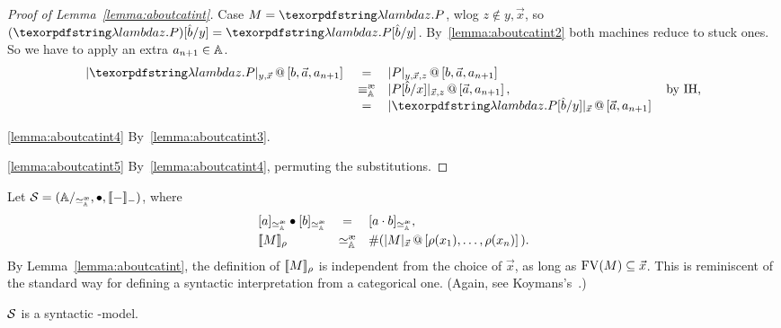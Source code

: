 \begin{proof}[Proof of Lemma~\ref{lemma:aboutcatint}]
Case $M = \lam z.P$, wlog $z\notin y,\vec x$, so $(\lam z.P)\subst{y}{\cons b} = \lam z.P\subst{y}{\cons b}$.
	By~\ref{lemma:aboutcatint2} both machines reduce to stuck ones.
	So we have to apply an extra $a_{n+1}\in\mathbb{A}$.
\[
	\begin{array}{lcll}
	\append{\CInt[y,\vec x]{\lam z.P}}{b,\vec a,a_{n+1}}&=&\append{\CInt[y,\vec x,z]{P}}{b,\vec a,a_{n+1}}&\\
	&\equivea&\append{\CInt[\vec x,z]{P\subst{x}{\cons b}}}{\vec a,a_{n+1}},&\textrm{by IH,}\\
	&=& \append{\CInt{\lam z.P\subst{y}{\cons b}}}{\vec a,a_{n+1}}
	\end{array}
\]

\ref{lemma:aboutcatint4} By~\ref{lemma:aboutcatint3}. %

\ref{lemma:aboutcatint5} By~\ref{lemma:aboutcatint4}, permuting the substitutions. %
\end{proof}


\begin{defi}\label{def:thelambdamodel}
Let $\cS = (\Addrs/_{\simea},\bullet, \Int{-}{-})$, where
\[
	\begin{array}{lcl}
	[a]_{\simea}\bullet [b]_{\simea}&=&[\App{a}{b}]_{\simea},\\[3pt]
	\Int{M}{\rho} &\simea& \Lookup(\append{\CInt{M}}{\rho(x_1),\dots,\rho(x_n)}).\\
	\end{array}
\]
By Lemma~\ref{lemma:aboutcatint}, the definition of $[\![ M]\!]_{\rho}$ is independent from the choice of $\vec x$, as long as $\mathrm{FV}(M)\subseteq\vec x$. This is reminiscent of the standard way for defining a syntactic interpretation from a categorical one. (Again, see Koymans's~\cite{Koymans82}.)
\end{defi}

\begin{thm}\label{thm:Sinsonoextslm}
$\mathcal{S}$ is a syntactic \lam-model.
\end{thm}

